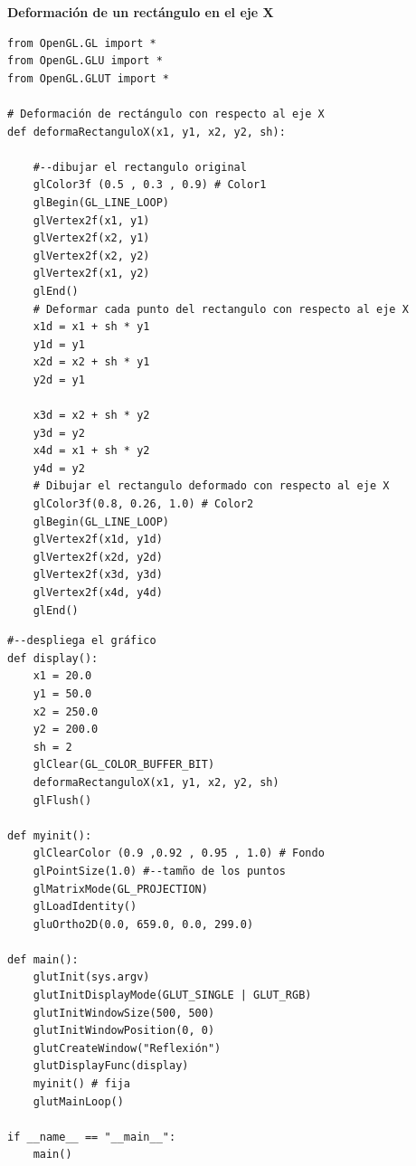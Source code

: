 \documentclass[a4paper]{article}
\begin{document}
\restoregeometry
\newpage

\Large{\textbf{Deformación de un rectángulo en el eje X}}\\[-0.4cm]
\begin{center}
\begin{mycodeboxl}
\begin{lstlisting}
from OpenGL.GL import *
from OpenGL.GLU import *
from OpenGL.GLUT import *
 
# Deformación de rectángulo con respecto al eje X
def deformaRectanguloX(x1, y1, x2, y2, sh):
 
    #--dibujar el rectangulo original
    glColor3f (0.5 , 0.3 , 0.9) # Color1
    glBegin(GL_LINE_LOOP)
    glVertex2f(x1, y1)
    glVertex2f(x2, y1)
    glVertex2f(x2, y2)
    glVertex2f(x1, y2)
    glEnd()
    # Deformar cada punto del rectangulo con respecto al eje X
    x1d = x1 + sh * y1
    y1d = y1
    x2d = x2 + sh * y1
    y2d = y1
 
    x3d = x2 + sh * y2
    y3d = y2
    x4d = x1 + sh * y2
    y4d = y2
    # Dibujar el rectangulo deformado con respecto al eje X
    glColor3f(0.8, 0.26, 1.0) # Color2
    glBegin(GL_LINE_LOOP)
    glVertex2f(x1d, y1d)
    glVertex2f(x2d, y2d)
    glVertex2f(x3d, y3d)
    glVertex2f(x4d, y4d)
    glEnd()
\end{lstlisting}
\end{mycodeboxl}
\end{center}
\newpage
\begin{center}
\begin{mycodeboxl}
\begin{lstlisting}
#--despliega el gráfico
def display():
    x1 = 20.0
    y1 = 50.0
    x2 = 250.0
    y2 = 200.0
    sh = 2
    glClear(GL_COLOR_BUFFER_BIT) 
    deformaRectanguloX(x1, y1, x2, y2, sh)
    glFlush() 

def myinit():
    glClearColor (0.9 ,0.92 , 0.95 , 1.0) # Fondo
    glPointSize(1.0) #--tamño de los puntos
    glMatrixMode(GL_PROJECTION)
    glLoadIdentity()
    gluOrtho2D(0.0, 659.0, 0.0, 299.0)
 
def main():
    glutInit(sys.argv)
    glutInitDisplayMode(GLUT_SINGLE | GLUT_RGB)
    glutInitWindowSize(500, 500)
    glutInitWindowPosition(0, 0)
    glutCreateWindow("Reflexión")
    glutDisplayFunc(display)
    myinit() # fija 
    glutMainLoop() 
 
if __name__ == "__main__":
    main()
\end{lstlisting}
\end{mycodeboxl}
\end{center}
\end{document}
